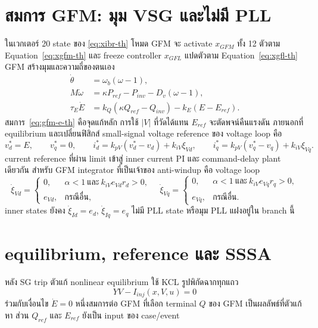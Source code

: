 \documentclass[12pt,a4paper]{article}
\begin{document}
\section{สมการ GFM: มุม VSG และไม่มี PLL}

ในเวกเตอร์ 20 state ของ \eqref{eq:xibr-th} โหมด GFM จะ activate $x_{GFM}$ ทั้ง 12 ตัวตาม
Equation~\eqref{eq:xgfm-th} และ freeze controller $x_{GFL}$ แปดตัวตาม Equation~\eqref{eq:xgfl-th}
GFM สร้างมุมและความถี่ของตนเอง
\begin{align}
\dot\theta&=\omega_b(\omega-1),\\
M\dot\omega&=\kappa P_{ref}-P_{inv}-D_v(\omega-1),\\
\tau_E\dot E&=k_Q(\kappa Q_{ref}-Q_{inv})-k_E(E-E_{ref}).
\label{eq:gfm-e-th}
\end{align}
สมการ~\eqref{eq:gfm-e-th} คือจุดแก้หลัก การใช้ $|V|$ ที่วัดได้แทน $E_{ref}$ จะตัดพจน์คืนแรงดัน
ภายนอกที่ equilibrium และเปลี่ยนฟิสิกส์ small-signal voltage reference ของ voltage loop คือ
\begin{equation}
v_d^*=E,\qquad v_q^*=0,\qquad
i_d^*=k_{pV}(v_d^*-v_d)+k_{iV}\xi_{Vd},\qquad
i_q^*=k_{pV}(v_q^*-v_q)+k_{iV}\xi_{Vq}.
\end{equation}
current reference ที่ผ่าน limit เข้าสู่ inner current PI และ command-delay plant เดียวกัน สำหรับ GFM
integrator ที่เป็นเจ้าของ anti-windup คือ voltage loop
\begin{equation}
\dot\xi_{Vd}=\begin{cases}0,&\alpha<1\ \text{และ}\ k_{iV}e_{Vd}r_d>0,\\e_{Vd},&\text{กรณีอื่น},\end{cases}
\quad
\dot\xi_{Vq}=\begin{cases}0,&\alpha<1\ \text{และ}\ k_{iV}e_{Vq}r_q>0,\\e_{Vq},&\text{กรณีอื่น}.\end{cases}
\end{equation}
inner states ยังคง $\dot\xi_{Id}=e_d$, $\dot\xi_{Iq}=e_q$ ไม่มี PLL state หรือมุม PLL แฝงอยู่ใน branch นี้

\section{equilibrium, reference และ SSSA}

หลัง SG trip ตัวแก้ nonlinear equilibrium ใช้ KCL รูปพิกัดฉากทุกแถว
\begin{equation}
YV-I_{inj}(x,V,u)=0
\end{equation}
ร่วมกับเงื่อนไข $\dot E=0$ หนึ่งสมการต่อ GFM ที่เลือก terminal $Q$ ของ GFM เป็นผลลัพธ์ที่ตัวแก้หา
ส่วน $Q_{ref}$ และ $E_{ref}$ ยังเป็น input ของ case/event
\end{document}
